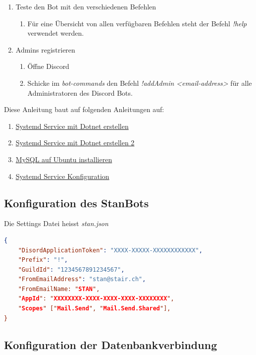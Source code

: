 \documentclass[a4paper, table]{article}
\begin{document}
\begin{enumerate}
    \item Teste den Bot mit den verschiedenen Befehlen
        \begin{enumerate}
            \item Für eine Übersicht von allen verfügbaren Befehlen steht der Befehl \textit{!help} verwendet werden.
        \end{enumerate}
    \item Admins registrieren
        \begin{enumerate}
            \item Öffne Discord
            \item Schicke im \textit{bot-commands} den Befehl \textit{!addAdmin <email-address>} für alle Administratoren des Discord Bots.
        \end{enumerate}
\end{enumerate}
Diese Anleitung baut auf folgenden Anleitungen auf:
\begin{enumerate}
    \item \href{https://devblogs.microsoft.com/dotnet/net-core-and-systemd/}{Systemd Service mit Dotnet erstellen}
    \item \href{https://blog.maartenballiauw.be/post/2021/05/25/running-a-net-application-as-a-service-on-linux-with-systemd.html}{Systemd Service mit Dotnet erstellen 2}
    \item \href{https://www.digitalocean.com/community/tutorials/how-to-install-mysql-on-ubuntu-20-04}{MySQL auf Ubuntu installieren}
    \item \href{https://askubuntu.com/questions/1004853/systemd-is-hanging-when-i-start-or-restart-a-service}{Systemd Service Konfiguration}
\end{enumerate}

\subsection{Konfiguration des StanBots}\label{konfigurationStanBot}

Die Settings Datei heisst \textit{stan.json}
\begin{lstlisting}[language=json]
{
    "DisordApplicationToken": "XXXX-XXXXX-XXXXXXXXXXXX",
    "Prefix": "!",
    "GuildId": "1234567891234567",
    "FromEmailAddress": "stan@stair.ch",
    "FromEmailName: "STAN",
    "AppId": "XXXXXXXX-XXXX-XXXX-XXXX-XXXXXXXX",
    "Scopes" ["Mail.Send", "Mail.Send.Shared"],
}
\end{lstlisting}

\subsection{Konfiguration der Datenbankverbindung}
\end{document}
